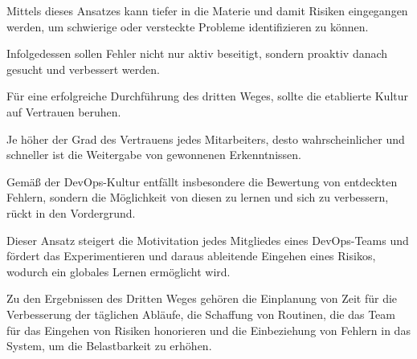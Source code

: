 Mittels dieses Ansatzes kann tiefer in die Materie und damit Risiken eingegangen werden, um schwierige oder versteckte Probleme identifizieren zu können. 

Infolgedessen sollen Fehler nicht nur aktiv beseitigt, sondern proaktiv danach gesucht und verbessert werden. \cite[S. 255]{tiemeyer_handbuch_2021}

Für eine erfolgreiche Durchführung des dritten Weges, sollte die etablierte Kultur auf Vertrauen beruhen. 

Je höher der Grad des Vertrauens jedes Mitarbeiters, desto wahrscheinlicher und schneller ist die Weitergabe von gewonnenen Erkenntnissen. \cite[S. 357]{kim_phoenix_2014}

Gemäß der DevOps-Kultur entfällt insbesondere die Bewertung von entdeckten Fehlern, sondern die Möglichkeit von diesen zu lernen und sich zu verbessern, rückt in den Vordergrund. 

Dieser Ansatz steigert die Motivitation jedes Mitgliedes eines DevOps-Teams und fördert das Experimentieren und daraus ableitende Eingehen eines Risikos, wodurch ein globales Lernen ermöglicht wird. 

Zu den Ergebnissen des Dritten Weges gehören die Einplanung von Zeit für die Verbesserung der täglichen Abläufe, die Schaffung von Routinen, die das Team für das Eingehen von Risiken honorieren und die Einbeziehung von Fehlern in das System, um die Belastbarkeit zu erhöhen.


